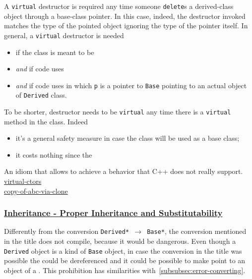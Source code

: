 A \texttt{virtual} destructor is required any time someone 
\texttt{delete}s a derived-class object through a base-class pointer. 
In this case, indeed, the destructor invoked matches the type of the 
pointed object ignoring the type of the pointer itself.
\newline
In general, a \texttt{virtual} destructor is needed
\begin{itemize}
    \item if the class is meant to be 
    \item \textit{and} if code uses 
    \item \textit{and} if code uses  in which 
          \texttt{p} is a pointer to \texttt{Base} pointing to an actual 
          object of \texttt{Derived} class.
\end{itemize}
To be shorter, destructor needs to be \texttt{virtual} any time there 
is a \texttt{virtual} method in the class. Indeed
\begin{itemize}
    \item it's a general safety measure in case the class will be used 
    as a base class;
    \item it costs nothing since the 
\end{itemize}

\label{npar:virtual-ctor}
An idiom that allows to achieve a behavior that C++ does not really 
support.
\newline
\href{https://isocpp.org/wiki/faq/virtual-functions#virtual-ctors}{virtual-ctors} \\
\href{https://isocpp.org/wiki/faq/abcs#copy-of-abc-via-clone}{copy-of-abc-via-clone}



\subsubsection{\href{https://isocpp.org/wiki/faq/proper-inheritance}{\textbf{Inheritance - Proper Inheritance and Substitutability}}}
\label{subsubsec:proper-inheritance}

Differently from the conversion \texttt{Derived* $\rightarrow$ Base*}, 
the conversion mentioned in the title does not compile, because it 
would be dangerous.
\newline
Even though a \texttt{Derived} object is a kind of 
\texttt{Base} object, in case the conversion in the title was possible 
the  could be dereferenced and it could be possible 
to make  point to an object of a 
.
\newline
This prohibition has similarities with~\ref{subsubsec:error-converting}.

